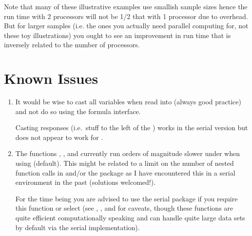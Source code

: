 \documentclass[nojss]{jss}
\begin{document}
Note that many of these illustrative examples use smallish sample
sizes hence the run time with 2 processors will not be 1/2 that with 1
processor due to overhead. But for larger samples (i.e. the ones you
actually need parallel computing for, not these toy illustrations) you
ought to see an improvement in run time that is inversely related to
the number of processors.

\section{Known Issues}

\begin{enumerate}
  
\item It would be wise to cast all variables when read into
   (always good practice) and not do so using the formula
  interface. 
  
  Casting responses (i.e.~stuff to the left of the \code{~}) works in
  the serial version but does not appear to work for .
  
\item The functions , ,
   and  currently run orders of
  magnitude slower under  when using
   (default). This might be related to a
  limit on the number of nested function calls in  and/or
  the  package as I have encountered this in a serial
  environment in the past (solutions welcomed!).
  
  For the time being you are advised to use the serial 
  package if you require this function or select
   (see , ,
   and  for caveats, though these
  functions are quite efficient computationally speaking and can
  handle quite large data sets by default via the serial
  implementation).
  
\end{enumerate}
\end{document}
